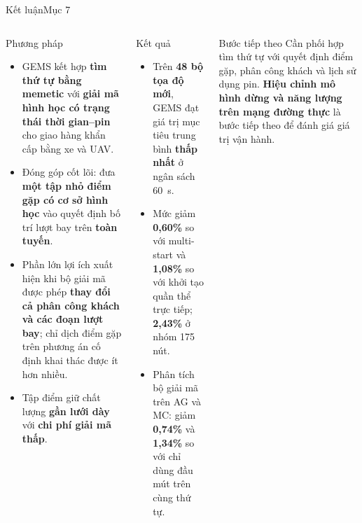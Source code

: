\documentclass[aspectratio=169,10pt,t,xcolor={table}]{beamer}
\newcommand{\src}[1]{\hfill{\normalfont\footnotesize\color{white!62!navy}#1}}  %
\newif\ifmaindividers \maindividerstrue
\begin{document}
\begin{frame}{Kết luận\src{Mục 7}}
\begin{columns}[T,onlytextwidth]
\begin{block}{Phương pháp}
\footnotesize
\begin{itemize}
\item GEMS kết hợp \textbf{tìm thứ tự bằng memetic} với \textbf{giải mã hình học có trạng thái thời gian--pin} cho giao hàng khẩn cấp bằng xe và UAV.
\item Đóng góp cốt lõi: đưa \textbf{một tập nhỏ điểm gặp có cơ sở hình học} vào quyết định bố trí lượt bay trên \textbf{toàn tuyến}.
\item Phần lớn lợi ích xuất hiện khi bộ giải mã được phép \textbf{thay đổi cả phân công khách và các đoạn lượt bay}; chỉ dịch điểm gặp trên phương án cố định khai thác được ít hơn nhiều.
\item Tập điểm giữ chất lượng \textbf{gần lưới dày} với \textbf{chi phí giải mã thấp}.
\end{itemize}
\end{block}
\begin{alertblock}{Kết quả}
\footnotesize
\begin{itemize}
\item Trên \textbf{48 bộ tọa độ mới}, GEMS đạt giá trị mục tiêu trung bình \textbf{thấp nhất} ở ngân sách 60~s.
\item Mức giảm \textbf{0,60\%} so với multi-start và \textbf{1,08\%} so với khởi tạo quần thể trực tiếp; \textbf{2,43\%} ở nhóm 175 nút.
\item Phân tích bộ giải mã trên AG và MC: giảm \textbf{0,74\%} và \textbf{1,34\%} so với chỉ dùng đầu mút trên cùng thứ tự.
\end{itemize}
\end{alertblock}
\begin{exampleblock}{Bước tiếp theo}
\footnotesize Cần phối hợp tìm thứ tự với quyết định điểm gặp, phân công khách và lịch sử dụng pin. \textbf{Hiệu chỉnh mô hình dừng và năng lượng trên mạng đường thực} là bước tiếp theo để đánh giá giá trị vận hành.
\end{exampleblock}
\end{columns}
\end{frame}
\maindividersfalse
\end{document}
